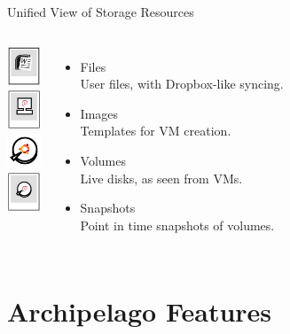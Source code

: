 \documentclass[utf8]{beamer}
\begin{document}
\begin{frame}{Unified View of Storage Resources}
\begin{columns}
  \includegraphics[width=1cm]{figures/files.png}\\[1em]

  \includegraphics[width=1cm]{figures/images.png}\\[1em]

  \includegraphics[width=1cm]{figures/volumes.png}\\[1em]

  \includegraphics[width=1cm]{figures/snapshots.png}
  \begin{itemize}
  \item Files\\
    User files, with Dropbox-like syncing.\\[1em]
  \item Images\\
    Templates for VM creation.\\[1em]
  \item Volumes\\
    Live disks, as seen from VMs.\\[1em]
  \item Snapshots\\
    Point in time snapshots of volumes.
  \end{itemize}
\end{columns}
\end{frame}

\section{Archipelago Features}
\end{document}
